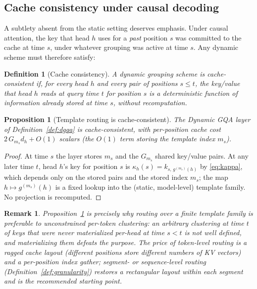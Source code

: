 \documentclass{article}
\newtheorem{proposition}[theorem]{Proposition}
\newtheorem{definition}[theorem]{Definition}
\newtheorem{remark}[theorem]{Remark}
\begin{document}
\subsection{Cache consistency under causal decoding}
\label{sec:cache-consistency}

A subtlety absent from the static setting deserves emphasis. Under causal
attention, the key that head $h$ uses for a \emph{past} position $s$ was
committed to the cache at time $s$, under whatever grouping was active at
time $s$. Any dynamic scheme must therefore satisfy:

\begin{definition}[Cache consistency]
\label{def:consistency}
A dynamic grouping scheme is \emph{cache-consistent} if, for every head $h$
and every pair of positions $s \le t$, the key/value that head $h$ reads at
query time $t$ for position $s$ is a deterministic function of information
already stored at time $s$, without recomputation.
\end{definition}

\begin{proposition}[Template routing is cache-consistent]
\label{prop:consistency}
The Dynamic GQA layer of Definition~\ref{def:dgqa} is cache-consistent, with
per-position cache cost $2\, G_{m_s} d_h + O(1)$ scalars (the $O(1)$ term
storing the template index $m_s$).
\end{proposition}

\begin{proof}
At time $s$ the layer stores $m_s$ and the $G_{m_s}$ shared key/value pairs.
At any later time $t$, head $h$'s key for position $s$ is
$\kappa_h(s) = k_{s,\, g^{(m_s)}(h)}$ by \eqref{eq:kappa}, which depends only
on the stored pairs and the stored index $m_s$; the map
$h \mapsto g^{(m_s)}(h)$ is a fixed lookup into the (static, model-level)
template family. No projection is recomputed.
\end{proof}

\begin{remark}
Proposition~\ref{prop:consistency} is precisely why routing over a
\emph{finite template family} is preferable to unconstrained per-token
clustering: an arbitrary clustering at time $t$ of keys that were never
materialized per-head at time $s < t$ is not well defined, and materializing
them defeats the purpose. The price of token-level routing is a ragged cache
layout (different positions store different numbers of KV vectors) and a
per-position index gather; segment- or sequence-level routing
(Definition~\ref{def:granularity}) restores a rectangular layout within each
segment and is the recommended starting point.
\end{remark}
\end{document}
